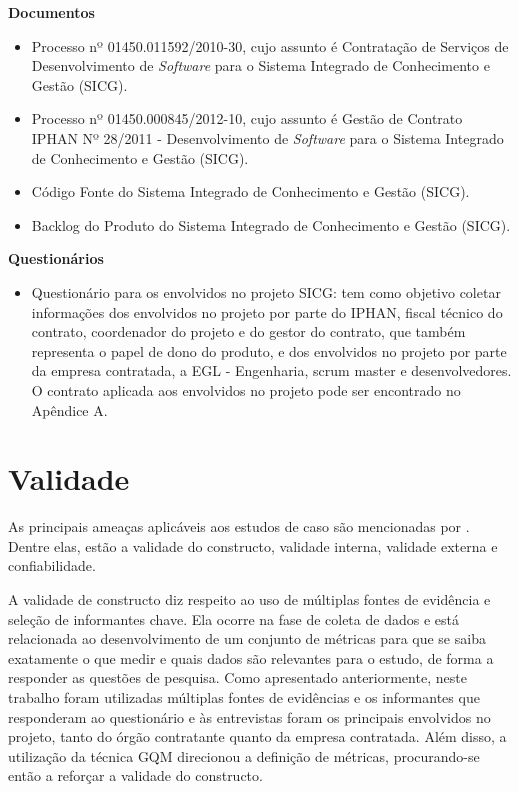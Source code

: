 \textbf{Documentos}
\begin{itemize}
\item Processo nº 01450.011592/2010-30, cujo assunto é Contratação de Serviços de Desenvolvimento de \textit{Software} para o Sistema Integrado de Conhecimento e Gestão (SICG). 
\item Processo nº 01450.000845/2012-10, cujo assunto é Gestão de Contrato IPHAN Nº 28/2011 - Desenvolvimento de \textit{Software} para o Sistema Integrado de Conhecimento e Gestão (SICG). 
\item Código Fonte do Sistema Integrado de Conhecimento e Gestão (SICG).
\item Backlog do Produto do Sistema Integrado de Conhecimento e Gestão (SICG).
\end{itemize}

\textbf{Questionários}
\begin{itemize}
\item Questionário para os envolvidos no projeto SICG: tem como objetivo coletar informações dos envolvidos no projeto por parte do IPHAN,  fiscal técnico do contrato, coordenador do projeto e do gestor do contrato, que também representa o papel de dono do produto, e dos envolvidos no projeto por parte da empresa contratada, a EGL - Engenharia, scrum master e desenvolvedores. O contrato aplicada aos envolvidos no projeto pode ser encontrado no Apêndice A.
\end{itemize}

\section[Validade]{Validade}

As principais ameaças aplicáveis aos estudos de caso 
são mencionadas por . Dentre elas, estão a validade do constructo, validade interna, validade externa e confiabilidade.

A validade de constructo diz respeito ao uso de múltiplas fontes de evidência e seleção de informantes chave. Ela ocorre na fase de coleta de dados e está relacionada ao desenvolvimento de um conjunto de métricas para que se saiba exatamente o que medir e quais dados são relevantes para o estudo, de forma a responder as questões de pesquisa. Como apresentado anteriormente, neste trabalho foram utilizadas múltiplas fontes de evidências e os informantes que responderam ao questionário e às entrevistas foram os principais envolvidos no projeto, tanto do órgão contratante quanto da empresa contratada. Além disso, a utilização da técnica GQM direcionou a definição de métricas, procurando-se então a reforçar a validade do constructo.

